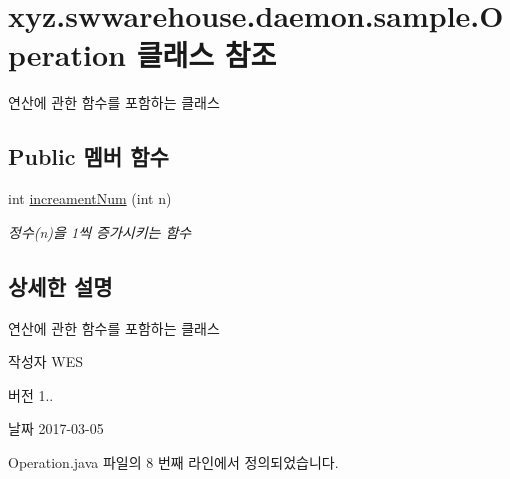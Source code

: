 \hypertarget{classxyz_1_1swwarehouse_1_1daemon_1_1sample_1_1_operation}{\section{xyz.\-swwarehouse.\-daemon.\-sample.\-Operation 클래스 참조}
\label{classxyz_1_1swwarehouse_1_1daemon_1_1sample_1_1_operation}
}


연산에 관한 함수를 포함하는 클래스  


\subsection*{Public 멤버 함수}
\begin{DoxyCompactItemize}
\item 
int \hyperlink{classxyz_1_1swwarehouse_1_1daemon_1_1sample_1_1_operation_a61a8a3f554babccb3b68a4ad16384d50}{increament\-Num} (int n)
\begin{DoxyCompactList}\small\item\em 정수(n)을 1씩 증가시키는 함수 \end{DoxyCompactList}\end{DoxyCompactItemize}


\subsection{상세한 설명}
연산에 관한 함수를 포함하는 클래스 

\begin{DoxyAuthor}{작성자}
W\-E\-S 
\end{DoxyAuthor}
\begin{DoxyVersion}{버전}
1.. 
\end{DoxyVersion}
\begin{DoxyDate}{날짜}
2017-\/03-\/05 
\end{DoxyDate}


Operation.\-java 파일의 8 번째 라인에서 정의되었습니다.



